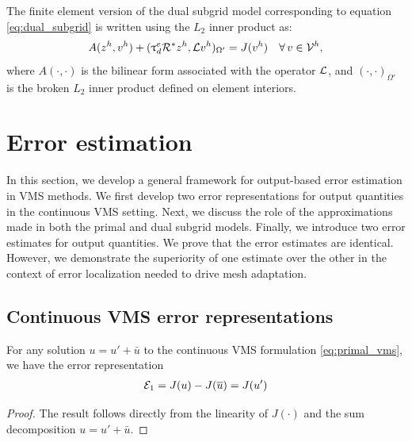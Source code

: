 \begin{rmk}
The finite element version of the dual subgrid model
corresponding to equation \eqref{eq:dual_subgrid} is
written using the $L_2$ inner product as:
%
\begin{gather}
A(z^h, v^h) + (\uptau^e_d \mathcal{R}^* z^h, \mathcal{L} v^h)_{\Omega'} = J(v^h)
\quad \forall \, v \in \mathcal{V}^h,
\label{eq:dual_fem}
\end{gather}
%
where $A(\cdot, \cdot)$ is the bilinear form associated with
the operator $\mathcal{L}$, and $(\cdot, \cdot)_{\Omega'}$ is the broken
$L_2$ inner product defined on element interiors.
\end{rmk}

\section{Error estimation}
\label{sec:Error}

In this section, we develop a general framework for output-based
error estimation in VMS methods. We first develop two error
representations for output quantities in the continuous VMS setting.
Next, we discuss the role of the approximations made in both the
primal and dual subgrid models. Finally, we introduce two error
estimates for output quantities. We prove that the error estimates
are identical. However, we demonstrate the superiority of one
estimate over the other in the context of error localization needed
to drive mesh adaptation.

\subsection{Continuous VMS error representations}

\begin{prop}
For any solution $u = u' + \bar{u}$ to the continuous VMS
formulation \eqref{eq:primal_vms}, we have the error representation
%
\begin{gather}
\mathcal{E}_1 = J(u) - J(\overline{u}) = J(u')
\end{gather}
%
\end{prop}

\begin{proof}
The result follows directly from the linearity of $J(\cdot)$ and
the sum decomposition $u = u' + \bar{u}$.
\end{proof}

